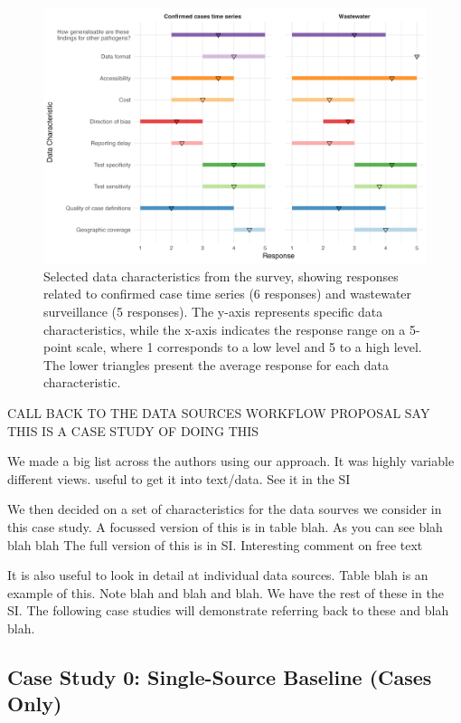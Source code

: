\documentclass{article}
\begin{document}
\begin{figure}[H] 
\includegraphics[width=1\linewidth]{figures/survey_responses.png}
\centering
\caption{ Selected data characteristics from the survey, showing responses related to confirmed case time series (6 responses) and wastewater surveillance (5 responses). The y-axis represents specific data characteristics, while the x-axis indicates the response range on a 5-point scale, where 1 corresponds to a low level and 5 to a high level. The lower triangles present the average response for each data characteristic.}
\label{survey_responses}
\end{figure}

CALL BACK TO THE DATA SOURCES WORKFLOW PROPOSAL
SAY THIS IS A CASE STUDY OF DOING THIS

We made a big list across the authors using our approach. It was highly variable different views. useful to get it into text/data. See it in the SI

We then decided on a set of characteristics for the data sourves we consider in this case study. A focussed version of this is in table blah. As you can see blah blah blah
The full version of this is in SI. Interesting comment on free text

It is also useful to look in detail at individual data sources. Table blah is an example of this. Note blah and blah and blah.
We have the rest of these in the SI. 
The following case studies will demonstrate referring back to these and blah blah.



\subsection{Case Study 0: Single-Source Baseline (Cases Only)}
\end{document}
